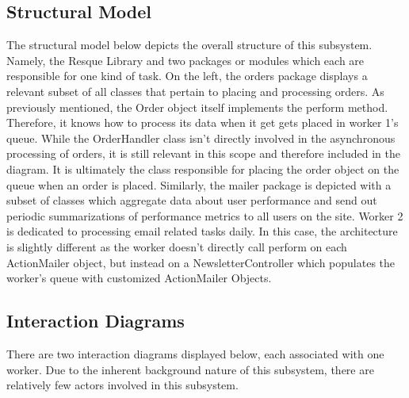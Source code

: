 \subsection{Structural Model}
The structural model below depicts the overall structure of this subsystem. Namely, the Resque Library and two packages or modules which each are responsible for one kind of task. On the left, the orders package displays a relevant subset of all classes that pertain to placing and processing orders. As previously mentioned, the Order object itself implements the perform method. Therefore, it knows how to process its data when it get gets placed in worker 1's queue. While the OrderHandler class isn't directly involved in the asynchronous processing of orders, it is still relevant in this scope and therefore included in the diagram. It is ultimately the class responsible for placing the order object on the queue when an order is placed. Similarly, the mailer package is depicted with a subset of classes which aggregate data about user performance and send out periodic summarizations of performance metrics to all users on the site. Worker 2 is dedicated to processing email related tasks daily. In this case, the architecture is slightly different as the worker doesn't directly call perform on each ActionMailer object, but instead on a NewsletterController which populates the worker's queue with customized ActionMailer Objects.

\newpage

\subsection{Interaction Diagrams}

There are two interaction diagrams displayed below, each associated with one worker. Due to the inherent background nature of this subsystem, there are relatively few actors involved in this subsystem.\\

